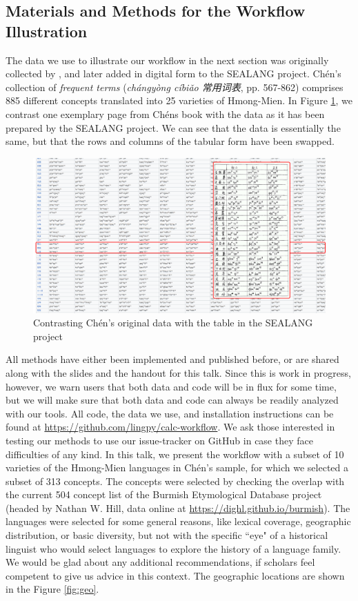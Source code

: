 \documentclass[xetex,svgnames]{scrartcl}
\begin{document}
\subsection{Materials and Methods for the Workflow Illustration}

The data we use to illustrate our workflow in the next section was originally collected by
\citet{Chen2012}, and later added in digital form to the SEALANG project\citep{Cooper2014,Sealang2005}. Chén's collection of
\emph{frequent terms} (\emph{chángyòng cíbiǎo 常用词表}, pp. 567-862) comprises 885 different
concepts translated into 25 varieties of Hmong-Mien. In Figure \ref{fig:data}, we contrast one
exemplary page from Chéns book with the data as it has been prepared by the SEALANG project\citep{Cooper2014,Sealang2005}.
We can see that the data is essentially the same, but that the rows and columns of the tabular form
have been swapped.

\begin{figure}[htb]
  \centering
  \includegraphics[width=\textwidth]{chen-illustration.pdf}
  \caption{Contrasting Chén's original data with the table in the SEALANG project}
  \label{fig:data}
\end{figure}

All methods have either been implemented and published before, or are shared along with the slides
and the handout for this talk. Since this is work in progress, however, we warn users that both data
and code will be in flux for some time, but we will make sure that both data and code can always be
readily analyzed with our tools. All code, the data we use, and installation instructions can be
found at \url{https://github.com/lingpy/calc-workflow}. We ask those interested in testing our
methods to use our issue-tracker on GitHub in case they face difficulties of any kind.
In this talk, we present the workflow with a subset of 10 varieties of the Hmong-Mien languages in
Chén's sample, for which we selected a subset of 313 concepts. The concepts were selected by
checking the overlap with the current 504 concept list of the Burmish Etymological Database project
(headed by Nathan W. Hill, data online at \url{https://dighl.github.io/burmish}).
The languages were selected for some general reasons, like lexical coverage, geographic
distribution, or basic diversity, but not with the specific ``eye" of a historical linguist who
would select languages to explore the history of a language family. We would be glad about any additional
recommendations, if scholars feel competent to give us advice in this context.
The
geographic locations are shown in the Figure \ref{fig:geo}.
\end{document}
